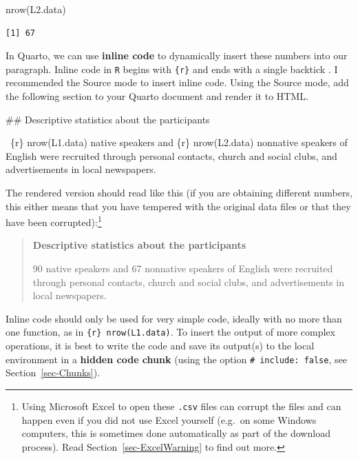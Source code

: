 \documentclass[
  letterpaper,
  DIV=11,
  numbers=noendperiod]{scrreprt}
\newenvironment{Shaded}{\begin{snugshade}}{\end{snugshade}}
\newcommand{\FunctionTok}[1]{\textcolor[rgb]{0.28,0.35,0.67}{#1}}
\newcommand{\InformationTok}[1]{\textcolor[rgb]{0.37,0.37,0.37}{#1}}
\newcommand{\NormalTok}[1]{\textcolor[rgb]{0.00,0.23,0.31}{#1}}
\begin{document}
\begin{Shaded}
\begin{Highlighting}[]
\FunctionTok{nrow}\NormalTok{(L2.data)}
\end{Highlighting}
\end{Shaded}

\begin{verbatim}
[1] 67
\end{verbatim}

In Quarto, we can use \textbf{inline code} to dynamically insert these
numbers into our paragraph. Inline code in \texttt{R} begins with
\texttt{\textasciigrave{}\{r\}} and ends with a single backtick
\texttt{\textasciigrave{}}. I recommended the Source mode to insert
inline code. Using the Source mode, add the following section to your
Quarto document and render it to HTML.

\begin{Shaded}
\begin{Highlighting}[]
\FunctionTok{\#\# Descriptive statistics about the participants}

 \InformationTok{\textasciigrave{}\{r\} nrow(L1.data)\textasciigrave{}}\NormalTok{ native speakers and }\InformationTok{\textasciigrave{}\{r\} nrow(L2.data)\textasciigrave{}}\NormalTok{ nonnative speakers of English were recruited through personal contacts, church and social clubs, and advertisements in local newspapers.}
\end{Highlighting}
\end{Shaded}

The rendered version should read like this (if you are obtaining
different numbers, this either means that you have tempered with the
original data files or that they have been corrupted):\footnote{Using
  Microsoft Excel to open these \texttt{.csv} files can corrupt the
  files and can happen even if you did not use Excel yourself (e.g.~on
  some Windows computers, this is sometimes done automatically as part
  of the download process). Read Section~\ref{sec-ExcelWarning} to find
  out more.}

\begin{quote}
\textbf{Descriptive statistics about the participants}

90 native speakers and 67 nonnative speakers of English were recruited
through personal contacts, church and social clubs, and advertisements
in local newspapers.
\end{quote}

Inline code should only be used for very simple code, ideally with no
more than one function, as in
\texttt{\textasciigrave{}\{r\}\ nrow(L1.data)\textasciigrave{}}. To
insert the output of more complex operations, it is best to write the
code and save its output(s) to the local environment in a \textbf{hidden
code chunk} (using the option \texttt{\#\textbar{}\ include:\ false},
see Section~\ref{sec-Chunks}).
\end{document}
